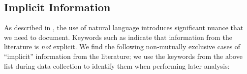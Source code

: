 

\subsection{Implicit Information}\label{imp-info}

As described in , the use of natural language introduces
significant nuance that we need to document. Keywords such as \impKeywords{}
indicate that information from the literature is \emph{not} explicit. We find
the following non-mutually exclusive cases of ``implicit'' information from the
literature; we use the keywords from the above list during data collection to
identify them when performing later analysis:

